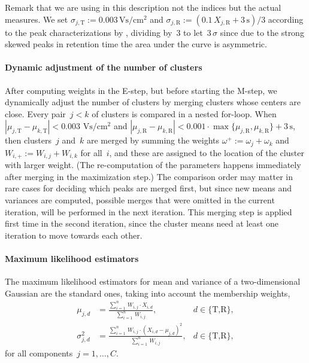 \documentclass{article}
\begin{document}
Remark that we are using in this description not the indices but the actual measures.
We set $\sigma_{j,\text{T}} := 0.003\,\text{Vs} / \text{cm}^2$ and $\sigma_{j,\text{R}} := (0.1 \, X_{j,\text{R}} + 3\,\text{s}) / 3$ according to the peak characterizations by \cite{bodeker2008peak}, dividing by~3 to let~$3\,\sigma$ since due to the strong skewed peaks in retention time the area under the curve is asymmetric.

\paragraph*{Dynamic adjustment of the number of clusters}
After computing weights in the E-step, but before starting the M-step, we dynamically adjust the number of clusters by merging clusters whose centers are close.
Every pair~$j < k$ of clusters is compared in a nested for-loop.
When $|\mu_{j,\text{T}} - \mu_{k,\text{T}}| < 0.003 \text{ Vs} / \text{cm}^2$ and $|\mu_{j,\text{R}} - \mu_{k,\text{R}}| < 0.001 \cdot \max\{\mu_{j, \text{R}},\mu_{k, \text{R}}\} + 3\,\text{s}$, then clusters~$j$ and~$k$ are merged by summing the weights $\omega^+:=\omega_j+\omega_k$ and $W_{i,+}:=W_{i,j}+W_{i,k}$ for all~$i$, and these are assigned to the location of the cluster with larger weight.
(The re-computation of the parameters happens immediately after merging in the maximization step.)
The comparison order may matter in rare cases for deciding which peaks are merged first, but since new means and variances are computed, possible merges that were omitted in the current iteration, will be performed in the next iteration.
This merging step is applied first time in the second iteration, since the cluster means need at least one iteration to move towards each other.

\paragraph*{Maximum likelihood estimators}
The maximum likelihood estimators for mean and variance of a two-dimensional Gaussian are the standard ones, taking into account the membership weights,
\begin{align}
\mu_{j,d}
  &= \frac{\sum_{i=1}^n\, W_{i, j} \cdot X_{i, d}}{\sum_{i=1}^n\, W_{i, j}}, 
  & d\in\{\text{T,R}\}, \\
\sigma_{j,d}^2
  &= \frac{\sum_{i=1}^n\, W_{i, j} \cdot (X_{i, d} - \mu_{j, d})^2} {\sum_{i=1}^n\, W_{i, j}}, 
  & d\in\{\text{T,R}\}, 
\end{align}
for all components~$j=1,\dots,C$.
\end{document}
